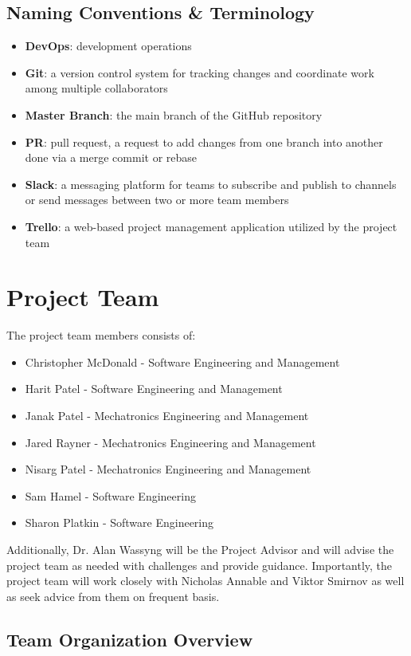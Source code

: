\documentclass[11pt]{article}
\begin{document}
\subsection{Naming Conventions \& Terminology}
\begin{itemize}
\item \textbf{DevOps}: development operations
\item \textbf{Git}: a version control system for tracking changes and coordinate work among multiple collaborators
\item \textbf{Master Branch}: the main branch of the GitHub repository
\item \textbf{PR}: pull request, a request to add changes from one branch into another done via a merge commit or rebase
\item \textbf{Slack}: a messaging platform for teams to subscribe and publish to channels or send messages between two or more team members
\item \textbf{Trello}: a web-based project management application utilized by the project team
\end{itemize}

\section{Project Team}
The project team members consists of:
\begin{itemize}
\item Christopher McDonald - Software Engineering and Management
\item Harit Patel - Software Engineering and Management
\item Janak Patel - Mechatronics Engineering and Management
\item Jared Rayner - Mechatronics Engineering and Management
\item Nisarg Patel - Mechatronics Engineering and Management
\item Sam Hamel - Software Engineering
\item Sharon Platkin - Software Engineering
\end{itemize}
Additionally, Dr. Alan Wassyng will be the Project Advisor and will advise the project team as needed with challenges and provide guidance. Importantly, the project team will work closely with Nicholas Annable and Viktor Smirnov as well as seek advice from them on frequent basis.

\subsection{Team Organization Overview}
\usetikzlibrary{shapes.geometric, arrows}
\end{document}
